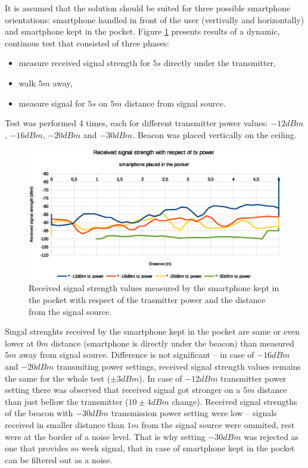 \documentclass[../main.tex]{subfiles}
\begin{document}
It is assumed that the solution should be suited for three possible smartphone orientations: smartphone handled in front of the user (vertivally and horizontally) and smartphone kept in the pocket. Figure \ref{fig:tests_case2_smartphone_in_pocket_tx_power} presents results of a dynamic, continous test that consisted of three phases:
\begin{itemize}
	\item measure received signal strength for $5 s$ directly under the transmitter,
	\item walk $5 m$ away,
	\item measure signal for $5 s$ on $5 m$ distance from signal source.
\end{itemize}

 Test was performed 4 times, each for different transmitter power values: $-12dBm$, $-16dBm$, $-20dBm$ and $-30dBm$. Beacon was placed vertically on the ceiling.

\begin{figure}[!htbp]
\includegraphics[width=\textwidth, keepaspectratio]{pictures/tests_case2_smartphone_in_pocket_tx_power}
\centering
\caption{Received signal strength values measured by the smartphone kept in the pocket with respect of the trasmitter power and the distance from the signal source.}
\label{fig:tests_case2_smartphone_in_pocket_tx_power}
\end{figure}

Singal strenghts received by the smartphone kept in the pocket are same or even lower at $0m$ distance (smartphone is directly under the beacon) than measured $5m$ away from signal source. Difference is not significant -- in case of $-16dBm$ and $-20dBm$ transmiting power settings, received signal strength values remains the same for the whole test ($\pm 3dBm$). In case of $-12dBm$ transmitter power setting there was observed that received signal got stronger on a $5m$ distance than just bellow the transmitter ($10\pm4 dBm$ change). Received signal strengths of the beacon with $-30dBm$ transmission power setting were low -- signals received in smaller distance than $1m$ from the signal source were ommited, rest were at the border of a noise level. That is why setting $-30dBm$ was rejected as one that provides so week signal, that in case of smartphone kept in the pocket can be filtered out as a noise.
\end{document}
